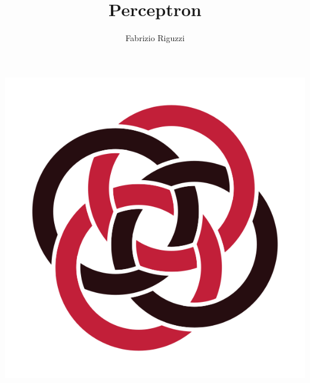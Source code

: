 \documentclass[trans]{beamer}
\title[Perceptron]
{Perceptron}
\author[F. Riguzzi] %
{Fabrizio Riguzzi}
\institute[] %
{
}
\date{}
\newcommand{\myalert}[1]{{%
 #1}}
\begin{document}
\begin{frame}
\titlepage 
\vspace{-2cm}
\begin{center}
\includegraphics[scale=0.280]{Twisted_rings.png}
\end{center}
\end{frame}
  \renewcommand{\concept}[1]{\myalert{#1}}
  \renewcommand{\koncept}[2]{\myalert{#1}}

\renewcommand{\Figure}[2]{%
    \begin{center}
    \texttt{[image: ../book/figs/\#1]}
    \end{center}
  }
\renewcommand{\Figure}[3]{%
    \begin{center}
    \texttt{[image: ../book/figs/\#1]}
    \end{center}
  }
  
\end{document}
